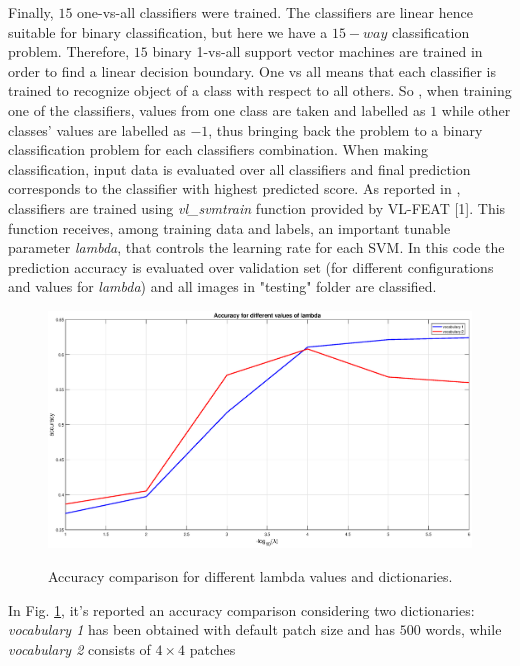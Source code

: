 Finally, $15$ one-vs-all classifiers were trained. The classifiers are linear hence suitable for binary classification, but here we have a $15-way$ classification problem. Therefore, $15$ binary 1-vs-all support vector machines are trained in order to find a linear decision boundary. One vs all means that each classifier is trained to recognize object of a class with respect to all others. So , when training one of the classifiers, values from one class are taken and labelled as $1$ while other classes' values are labelled as $-1$, thus bringing back the problem to a binary classification problem for each classifiers combination. When making classification, input data is evaluated over all classifiers and final prediction corresponds to the classifier with highest predicted score. As reported in , classifiers are trained using \textit{vl\_svmtrain} function provided by VL-FEAT [1].
This function receives, among training data and labels, an important tunable parameter \textit{lambda}, that controls the learning rate for each SVM. In this code the prediction accuracy is evaluated over validation set (for different configurations and values for \textit{lambda}) and all images in "testing" folder are classified.

\begin{figure}[!htbp] 
	\centering
	{\includegraphics[width=.5\linewidth]{./run2.eps}}
	\caption{Accuracy comparison for different lambda values and dictionaries.}
	\label{fig:run2}
\end{figure}

In Fig. \ref{fig:run2}, it's reported an accuracy comparison considering two dictionaries: \textit{vocabulary 1} has been obtained with default patch size and has $500$ words, while \textit{vocabulary 2} consists of $4\times 4$ patches 